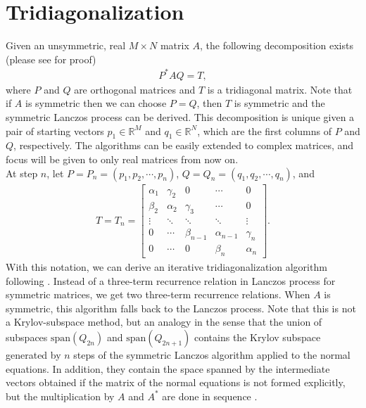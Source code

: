 \documentclass[10pt,letterpaper]{article}
\def\R{\mathbb{R}}
\def\alfa{\alpha}
\def\gama{\gamma}
\def\Span{\text{span}}
\begin{document}
\section{Tridiagonalization}
Given an unsymmetric, real $M \times N$ matrix $A$, the following 
decomposition exists (please see \cite{saunders:1988} for proof)
\begin{align}
    P^* A Q = T,
\end{align}
where $P$ and $Q$ are orthogonal matrices and $T$ is a tridiagonal 
matrix. Note that if $A$ is symmetric then we can choose $P =Q$, then
$T$ is symmetric and the symmetric Lanczos process can be derived. This
decomposition is unique given a pair of starting vectors 
$p_1 \in \R^M$ and $q_1 \in \R^N$, which are the first columns of $P$
and $Q$, respectively. 
The algorithms can be easily extended to complex matrices, and focus will 
be given to only real matrices from now on. \\

At step $n$, let $P = P_n = (p_1, p_2, \cdots, p_n)$, 
$Q = Q_n = (q_1, q_2, \cdots, q_n)$, and 
\begin{align} 
    T = T_n = 
    \begin{bmatrix}
            \alfa_1 & \gama_2 & 0       & \cdots & 0      \\
            \beta_2 & \alfa_2 & \gama_3 & \cdots & 0      \\
            \vdots  & \ddots  & \ddots  & \ddots & \vdots \\
            0       & \cdots  & \beta_{n-1} & \alfa_{n-1} & \gama_n \\
            0       & \cdots  & 0           & \beta_n     & \alfa_n
    \end{bmatrix}. 
\end{align}
With this notation, we can derive an iterative tridiagonalization algorithm 
 following \cite{saunders:1988}. Instead of a three-term
recurrence relation in Lanczos process for symmetric matrices, we get two
three-term recurrence relations. When $A$ is symmetric, this algorithm 
falls back to the Lanczos process. Note that this is not a Krylov-subspace
method, but an analogy in the sense that the union of subspaces 
$\Span(Q_{2n})$ and $\Span(Q_{2n+1})$ contains the Krylov subspace generated
by $n$ steps of the symmetric Lanczos algorithm applied to the normal 
equations. In addition, they contain the space spanned by the intermediate 
vectors obtained if the matrix of the normal equations is not formed 
explicitly, but the multiplication by $A$ and $A^*$ are done in sequence 
\cite{saunders:1988}.
\end{document}
